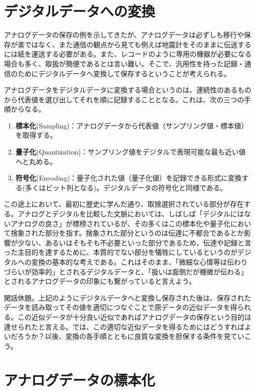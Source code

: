 \section{デジタルデータへの変換}

アナログデータの保存の例を示してきたが、アナログデータは必ずしも移行や保存が楽ではなく、また通信の観点から見ても例えば地震計をそのままに伝送するには紙を運送する必要がある。また、レコードのように専用の機器が必要になる場合も多く、取扱が簡便であるとは言い難い。そこで、汎用性を持った記録・通信のためにデジタルデータへ変換して保存するということが考えられる。

アナログデータをデジタルデータに変換する場合というのは、連続性のあるものから代表値を選び出してそれを順に記録することとなる。これは、次の三つの手順からなる。
\begin{enumerate}
\item \textbf{標本化}(Sampling)：アナログデータから代表値（サンプリング値・標本値）を取得する。
\item \textbf{量子化}(Quantization)：サンプリング値をデジタルで表現可能な最も近い値へと丸める。
\item \textbf{符号化}(Encoding)：量子化された値（量子化値）を記録できる形式に変換する(多くはビット列となる)。デジタルデータの符号化と同様である。
\end{enumerate}

この途上において、最初に歴史に学んだ通り、取捨選択されている部分が存在する。アナログとデジタルを比較した文脈においては、しばしば「デジタルにはないアナログの良さ」が標榜されているが、その多くはこの標本化や量子化において捨象された部分を指す。捨象された部分というのは伝達に不都合であるとか影響が少ない、あるいはそもそも不必要といった部分であるため、伝達や記録と言った主目的を達するために、本質的でない部分を犠牲にしているというのがデジタルへの変換の基本的な考えである。これはそのまま、「微細な心情等は伝わりづらいが効率的」とされるデジタルデータと、「扱いは面倒だが機微が伝わる」とされるアナログデータの印象にも繋がっていると言えよう。

閑話休題。上記のようにデジタルデータへと変換し保存された後は、保存されたデータを読み取ってその値を適切につなぐことで原データの近似データを得られる。この近似データが十分良い近似であればアナログデータの保存という目的は達せられたと言える。では、この適切な近似データを得るためにはどうすればよいだろうか？以後、変換の各手順とともに良質な変換を担保する条件を見ていこう。

\section{アナログデータの標本化}

